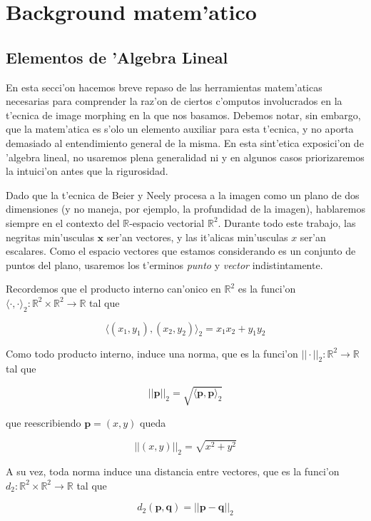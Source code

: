 \section{Background matem'atico}

\subsection{Elementos de 'Algebra Lineal}

En esta secci'on hacemos breve repaso de las herramientas matem'aticas necesarias para comprender la raz'on de ciertos c'omputos involucrados en la t'ecnica de image morphing en la que nos basamos. Debemos notar, sin embargo, que la matem'atica es s'olo un elemento auxiliar para esta t'ecnica, y no aporta demasiado al entendimiento general de la misma. En esta sint'etica exposici'on de 'algebra lineal, no usaremos plena generalidad ni y en algunos casos priorizaremos la intuici'on antes que la rigurosidad.

Dado que la t'ecnica de Beier y Neely procesa a la imagen como un plano de dos dimensiones (y no maneja, por ejemplo, la profundidad de la imagen), hablaremos siempre en el contexto del $\mathbb{R}$-espacio vectorial $\mathbb{R}^2$. Durante todo este trabajo, las negritas min'usculas $\mathbf{x}$ ser'an vectores, y las it'alicas min'usculas $x$ ser'an escalares. Como el espacio vectores que estamos considerando es un conjunto de puntos del plano, usaremos los t'erminos \textit{punto} y \textit{vector} indistintamente.

Recordemos que el producto interno can'onico en $\mathbb{R}^2$ es la funci'on $\langle \cdot, \cdot\rangle_2: \mathbb{R}^2 \times \mathbb{R}^2 \to \mathbb{R}$ tal que

\[\langle (x_1, y_1), (x_2, y_2)\rangle_2 = x_1 x_2 + y_1 y_2\]

\noindent
Como todo producto interno, induce una norma, que es la funci'on $||\cdot||_2:\mathbb{R}^2 \to \mathbb{R}$ tal que

\[||\mathbf{p}||_2 = \sqrt{\langle \mathbf{p}, \mathbf{p}\rangle_2}\]

\noindent
que reescribiendo $\mathbf{p} = (x, y)$ queda

\[||(x, y)||_2 = \sqrt{x^2 + y^2}\]

\noindent
A su vez, toda norma induce una distancia entre vectores, que es la funci'on $d_2:\mathbb{R}^2 \times \mathbb{R}^2 \to \mathbb{R}$ tal que 

\[d_2(\mathbf{p}, \mathbf{q}) = ||\mathbf{p} - \mathbf{q}||_2\]

